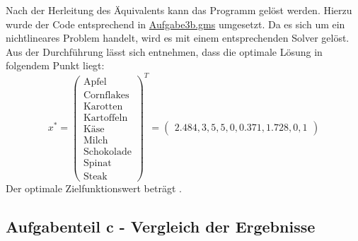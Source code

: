 \documentclass[a4paper,12pt]{article}
\begin{document}
Nach der Herleitung des \"Aquivalents kann das Programm gel\"ost werden. Hierzu wurde der Code entsprechend in \href{../src/r3/Aufgabe3b.gms}{Aufgabe3b.gms} umgesetzt. Da es sich um ein nichtlineares Problem handelt, wird es mit einem entsprechenden Solver gel\"ost.
Aus der Durchf\"uhrung l\"asst sich entnehmen, dass die optimale L\"osung in folgendem Punkt liegt:
\[
x^* = \begin{pmatrix}
    \text{Apfel} \\ \text{Cornflakes} \\ \text{Karotten} \\ \text{Kartoffeln} \\ \text{K\"ase} \\ \text{Milch} \\ \text{Schokolade} \\ \text{Spinat} \\ \text{Steak}
    \end{pmatrix}^T
     =
     \begin{pmatrix}
     2.484, 3, 5, 5, 0, 0.371, 1.728, 0, 1
        \end{pmatrix}
\]
Der optimale Zielfunktionswert betr\"agt .

\subsection*{Aufgabenteil c - Vergleich der Ergebnisse}
\end{document}
